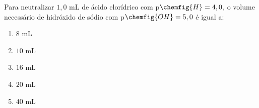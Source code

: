 Para neutralizar $1,0$ mL de ácido clorídrico com p$\chemfig{H} = 4,0$, o volume necessário de hidróxido de sódio com p$\chemfig{OH} = 5,0$ é igual a:

\begin{enumerate}[label = (\alph*)]
	\item $8$ mL
	\item $10$ mL
	\item $16$ mL
	\item $20$ mL
	\item $40$ mL
\end{enumerate}
